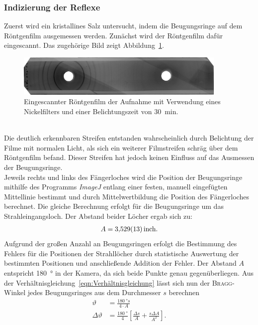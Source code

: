 \documentclass[a4paper,twoside,final]{article}
\begin{document}
\subsubsection{Indizierung der Reflexe}
Zuerst wird ein kristallines Salz untersucht, indem die Beugungsringe auf dem Röntgenfilm ausgemessen werden. Zunächst wird der Röntgenfilm dafür eingescannt. Das zugehörige Bild zeigt Abbildung~\ref{fig:Film_mitFilter}.
\begin{figure}[htp]
    \centering
        \includegraphics[width=0.9\textwidth]{Abbildungen/Roentgenfilm_mit_Filter.jpg}
    \caption{Eingescannter Röntgenfilm der Aufnahme mit Verwendung eines Nickelfilters und einer Belichtungszeit von \SI{30}{\minute}.}
    \label{fig:Film_mitFilter}
\end{figure}\\
Die deutlich erkennbaren Streifen entstanden wahrscheinlich durch Belichtung der Filme mit normalen Licht, als sich ein weiterer Filmstreifen schräg über dem Röntgenfilm befand. Dieser Streifen hat jedoch keinen Einfluss auf das Ausmessen der Beugungsringe.\\
Jeweils rechts und links des Fängerloches wird die Position der Beugungsringe mithilfe des Programms \textit{ImageJ} entlang einer festen, manuell eingefügten Mittellinie bestimmt und durch Mittelwertbildung die Position des Fängerloches berechnet. Die gleiche Berechnung erfolgt für die Beugungsringe um das Strahleingangsloch. Der Abstand beider Löcher ergab sich zu:
\begin{align}
  A = \SI{3,529\pm 0,013}{\text{inch}}.
\end{align}
Aufgrund der großen Anzahl an Beugungsringen erfolgt die Bestimmung des Fehlers für die Positionen der Strahllöcher durch statistische Auswertung der bestimmten Positionen und anschließende Addition der Fehler. Der Abstand $A$ entspricht \SI{180}{\degree} in der Kamera, da sich beide Punkte genau gegenüberliegen. Aus der Verhältnisgleichung~\eqref{eqn:Verhältnisgleichung} lässt sich nun der \textsc{Bragg}-Winkel jedes Beugungsringes aus dem Durchmesser $s$ berechnen
\begin{align}
  \vartheta &= \frac{\SI{180}{\degree}s}{4\cdot A}\\
  \Delta \vartheta &= \frac{\SI{180}{\degree}}{4}\left[\frac{\Delta s}{A} + \frac{s\Delta A}{A^2}\right].
\end{align}
\end{document}
